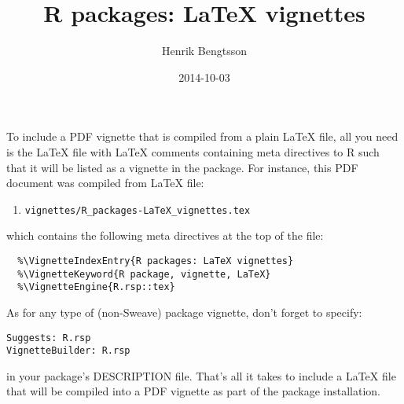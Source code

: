 \documentclass[12pt]{article}
\title{R packages: LaTeX vignettes}
\author{Henrik Bengtsson}
\date{2014-10-03}
\newcommand{\code}[1]{\texttt{#1}\xspace}
\begin{document}
\maketitle

To include a PDF vignette that is compiled from a plain LaTeX file,
all you need is the LaTeX file with LaTeX comments containing
meta directives to R such that it will be listed as a vignette in the
package.  For instance, this PDF document was compiled from LaTeX file:
\begin{enumerate}
 \item \code{vignettes/R\_packages-LaTeX\_vignettes.tex}
\end{enumerate}
which contains the following meta directives at the top of the file:
\begin{verbatim} 
  %\VignetteIndexEntry{R packages: LaTeX vignettes}
  %\VignetteKeyword{R package, vignette, LaTeX}
  %\VignetteEngine{R.rsp::tex}
\end{verbatim}
As for any type of (non-Sweave) package vignette, don't forget to specify:
\begin{verbatim}
Suggests: R.rsp
VignetteBuilder: R.rsp
\end{verbatim}
in your package's DESCRIPTION file.  That's all it takes to include a
LaTeX file that will be compiled into a PDF vignette as part of the
package installation.
\end{document}

